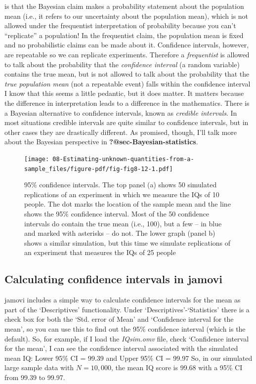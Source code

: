 \documentclass[
  a4paper,
]{book}
\begin{document}
is that the Bayesian claim makes a probability statement about the
population mean (i.e., it refers to our uncertainty about the population
mean), which is not allowed under the frequentist interpretation of
probability because you can't ``replicate'' a population! In the
frequentist claim, the population mean is fixed and no probabilistic
claims can be made about it. Confidence intervals, however, are
repeatable so we can replicate experiments. Therefore a
\emph{frequentist} is allowed to talk about the probability that the
\emph{confidence interval} (a random variable) contains the true mean,
but is not allowed to talk about the probability that the \emph{true
population mean} (not a repeatable event) falls within the confidence
interval I know that this seems a little pedantic, but it does matter.
It matters because the difference in interpretation leads to a
difference in the mathematics. There is a Bayesian alternative to
confidence intervals, known as \emph{credible intervals}. In most
situations credible intervals are quite similar to confidence intervals,
but in other cases they are drastically different. As promised, though,
I'll talk more about the Bayesian perspective in
\textbf{?@sec-Bayesian-statistics}.

\begin{figure}

\texttt{[image: 08-Estimating-unknown-quantities-from-a-sample\_files/figure-pdf/fig-fig8-12-1.pdf]} \hfill{}

\caption{\label{fig-fig8-12}95\% confidence intervals. The top panel (a)
shows 50 simulated replications of an experiment in which we measure the
IQs of 10 people. The dot marks the location of the sample mean and the
line shows the 95\% confidence interval. Most of the 50 confidence
intervals do contain the true mean (i.e., 100), but a few -- in blue and
marked with asterisks -- do not. The lower graph (panel b) shows a
similar simulation, but this time we simulate replications of an
experiment that measures the IQs of 25 people}

\end{figure}

\hypertarget{calculating-confidence-intervals-in-jamovi}{%
\subsection{Calculating confidence intervals in
jamovi}\label{calculating-confidence-intervals-in-jamovi}}

jamovi includes a simple way to calculate confidence intervals for the
mean as part of the `Descriptives' functionality. Under
`Descriptives'-`Statistics' there is a check box for both the `Std.
error of Mean' and `Confidence interval for the mean', so you can use
this to find out the 95\% confidence interval (which is the default).
So, for example, if I load the \emph{IQsim.omv} file, check `Confidence
interval for the mean', I can see the confidence interval associated
with the simulated mean IQ: Lower 95\% CI = 99.39 and Upper 95\% CI =
99.97 So, in our simulated large sample data with \(N = 10,000\), the
mean IQ score is 99.68 with a 95\% CI from 99.39 to 99.97.
\end{document}

